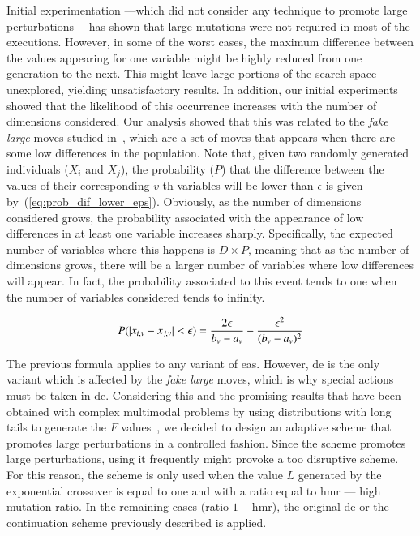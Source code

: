 \documentclass[preprint,3p]{elsarticle}
\newcommand{\EAS}{{\sc ea}s}
\newcommand{\DE}{{\sc de}}
\newcommand{\HMR}{{\sc hmr}}
\begin{document}
Initial experimentation ---which did not consider any technique to promote large perturbations---
has shown that large mutations were not required in most of the executions.
%
However, in some of the worst cases, the maximum difference between the values appearing for one variable might be
highly reduced from one generation to the next.
%
This might leave large portions of the search space unexplored, yielding unsatisfactory results.
%
In addition, our initial experiments showed that the likelihood of this occurrence increases with the
number of dimensions considered.
%
Our analysis showed that this was related to the \textit{fake large} moves studied in~\cite{Montgomery:09},
which are a set of moves that appears when there are some low differences in the population.
%
Note that, given two randomly generated individuals ($X_i$ and $X_j$), the probability ($P$) that the difference between the values
of their corresponding $v$-th variables will be lower than $\epsilon$ is given by~(\ref{eq:prob_dif_lower_eps}).
%
Obviously, as the number of dimensions considered grows, the probability associated with the appearance of low differences in at least one variable
increases sharply.
%
Specifically, the expected number of variables where this happens is $D \times P$, meaning that as the number of dimensions
grows, there will be a larger number of variables where low differences will appear.
%
In fact, the probability associated to this event tends to one when the number of variables considered tends to infinity.

\begin{equation}
	\label{eq:prob_dif_lower_eps}
		P(|x_{i,v} - x_{j,v}| < \epsilon) = {{2 \epsilon}\over{b_v - a_v}} - {{\epsilon^2}\over{({b_v - a_v})^2}}
\end{equation}
%

The previous formula applies to any variant of \EAS{}.
%
However, \DE{} is the only variant which is affected by the \textit{fake large} moves, which is why special actions
must be taken in \DE{}.
%
Considering this and the promising results that have been obtained with complex multimodal problems by using distributions with long tails to generate the $F$ values~\cite{Price:13},
we decided to design an adaptive scheme
that promotes large perturbations in a controlled fashion.
%
Since the scheme promotes large perturbations, using it frequently might provoke a too disruptive scheme.
%
For this reason, the scheme is only used when the value $L$ generated by the exponential crossover is equal to one
and with a ratio equal to \HMR{} --- high mutation ratio.
%
In the remaining cases (ratio $1 - $\HMR{}), the original \DE{} or the continuation scheme previously described is applied.
\end{document}
